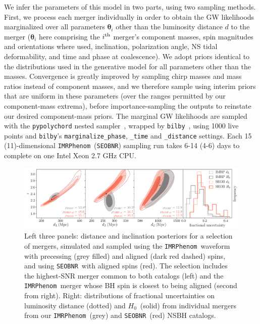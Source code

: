 \documentclass[%
 reprint,
 superscriptaddress,
 nofootinbib,
 amsmath,amssymb,
 aps,
]{revtex4-2}
\newcommand{\hubble}{\ensuremath{H_0}}
\newcommand{\seobnr}{\texttt{SEOBNR}}
\newcommand{\imrp}{\texttt{IMRPhenom}}
\begin{document}
We infer the parameters of this model in two parts, using two sampling methods. First, we process each merger individually in order to obtain the GW likelihoods marginalized over all parameters $\boldsymbol{\theta}_i$ other than the luminosity distance $d$ to the merger ($\boldsymbol{\theta}_i$ here comprising the $i^{\rm th}$ merger's component masses, spin magnitudes and orientations where used, inclination, polarization angle, NS tidal deformability, and time and phase at coalescence). We adopt priors identical to the distributions used in the generative model for all parameters other than the masses. Convergence is greatly improved by sampling chirp masses and mass ratios instead of component masses, and we therefore sample using interim priors that are uniform in these parameters (over the ranges permitted by our component-mass extrema), before importance-sampling the outputs to reinstate our desired component-mass priors. The marginal GW likelihoods are sampled with the \texttt{pypolychord} nested sampler~\cite{Handley_etal:2015a,*Handley_etal:2015b}, wrapped by \texttt{bilby}~\cite{Ashton_etal:2019}, using 1000 live points and \texttt{bilby}'s \texttt{marginalize\_phase}, \texttt{\_time} and \texttt{\_distance} settings. Each 15 (11)-dimensional \imrp\ (\seobnr) sampling run takes 6-14 (4-6) days to complete on one Intel Xeon 2.7 GHz CPU.

\begin{figure}[ht!]
\includegraphics[width=18cm]{fig_2.pdf}
\caption{Left three panels: distance and inclination posteriors for a selection of mergers, simulated and sampled using the \imrp\ waveform with precessing (grey filled) and aligned (dark red dashed) spins, and using \seobnr\ with aligned spins (red). The selection includes the highest-SNR merger common to both catalogs (left) and the \imrp\ merger whose BH spin is closest to being aligned (second from right). Right: distributions of fractional uncertainties on luminosity distance (dotted) and \hubble\ (solid) from individual mergers from our \imrp\ (grey) and \seobnr\ (red) NSBH catalogs. \label{fig:waveforms}}
\end{figure}
\end{document}
